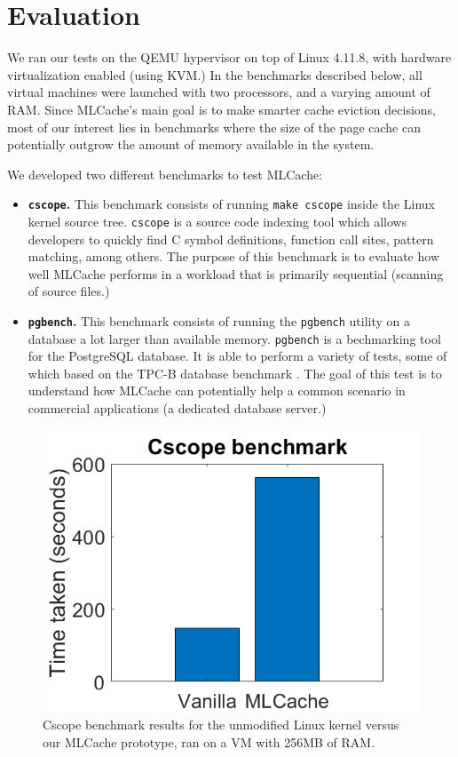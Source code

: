 \section{Evaluation}

We ran our tests on the QEMU \cite{qemu} hypervisor on top of Linux 4.11.8,
with hardware virtualization enabled (using KVM.) In the benchmarks described
below, all virtual machines were launched with two processors, and a varying
amount of RAM. Since MLCache's main goal is to make smarter cache eviction
decisions, most of our interest lies in benchmarks where the size of the page
cache can potentially outgrow the amount of memory available in the system.

We developed two different benchmarks to test MLCache:

\begin{itemize}
  \item \textbf{\texttt{cscope}.} This benchmark consists of running \texttt{make cscope}
    inside the Linux kernel source tree. \texttt{cscope} is a source code indexing
    tool which allows developers to quickly find C symbol definitions, function call
    sites, pattern matching, among others. The purpose of this benchmark is to evaluate
    how well MLCache performs in a workload that is primarily sequential (scanning of
    source files.)
  \item \textbf{\texttt{pgbench}.} This benchmark consists of running the \texttt{pgbench}
    utility on a database a lot larger than available memory. \texttt{pgbench} is a bechmarking
    tool for the PostgreSQL database. It is able to perform a variety of tests, some of
    which based on the TPC-B database benchmark \cite{tpcb}.  The goal of this test is to
    understand how MLCache can potentially help a common scenario in commercial applications
    (a dedicated database server.)
\end{itemize}

\label{fig:cscope}
\begin{figure}[h]
	\includegraphics[scale=0.4]{img/cscope_results_bigger.png}
	\caption{Cscope benchmark results for the unmodified Linux kernel versus our MLCache prototype, ran on a VM with 256MB of RAM.}
\end{figure}

